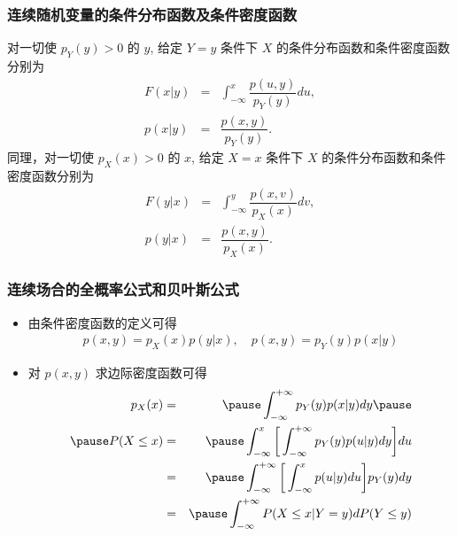 \begin{frame}
	\frametitle{连续随机变量的条件分布函数及条件密度函数}
	\begin{defi}
		对一切使 $p_Y (y)>0$ 的 $y$, 给定 $Y=y$ 条件下 $X$ 的条件分布函数和条件密度函数分别为
		\begin{eqnarray*}
			F(x|y)&=&\int_{-\infty}^x\dfrac{p(u,y)}{p_Y(y)}du,\\
			p(x|y)&=&\dfrac{p(x,y)}{p_Y(y)}.
		\end{eqnarray*}
		同理，对一切使 $p_X (x)>0$ 的 $x$, 给定 $X=x$ 条件下 $X$ 的条件分布函数和条件密度函数分别为
		\begin{eqnarray*}
			F(y|x)&=&\int_{-\infty}^y\dfrac{p(x,v)}{p_X(x)}dv,\\
			p(y|x)&=&\dfrac{p(x,y)}{p_X(x)}.
		\end{eqnarray*}
	\end{defi}
\end{frame}
\begin{frame}
	\frametitle{连续场合的全概率公式和贝叶斯公式}
	\begin{itemize}[<+-|alert@+>]
		\item 由条件密度函数的定义可得
		\begin{eqnarray*}
			p(x,y)=p_X(x)p(y|x), \quad p(x,y)=p_Y(y)p(x|y)
		\end{eqnarray*}
		\item 对 $p (x,y)$ 求边际密度函数可得
		\begin{eqnarray*}
			p_X(x)&=&\pause \int_{-\infty}^{+\infty}p_Y(y)p(x|y)dy\pause \\
			\pause P(X\le x)&=&\pause \int_{-\infty}^x\bigg[\int_{-\infty}^{+\infty}p_Y(y)p(u|y)dy\bigg]du\\
			&=&\pause \int_{-\infty}^{+\infty}\bigg[\int_{-\infty}^xp(u|y)du\bigg]p_Y(y)dy\\
			&=&\pause \int_{-\infty}^{+\infty}P(X\le x|Y=y)dP(Y\le y)
		\end{eqnarray*}

	\end{itemize}
\end{frame}
